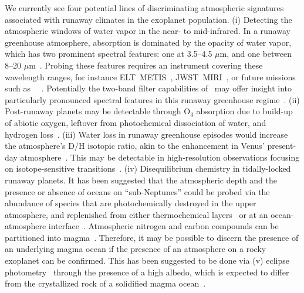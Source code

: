 \documentclass[twocolumn,twocolappendix,linenumbers]{aastex631}
\begin{document}
We currently see four potential lines of discriminating atmospheric signatures associated with runaway climates in the exoplanet population.
(i) Detecting the atmospheric windows of water vapor in the near- to mid-infrared.
In a runaway greenhouse atmosphere, absorption is dominated by the opacity of water vapor, which has two prominent spectral features: one at 3.5--4.5 $\mu$m, and one between 8--20 $\mu$m~\citep[e.g.,][]{Boukrouche2021}.
Probing these features requires an instrument covering these wavelength ranges, for instance ELT~METIS~\citep{Brandl2021}, JWST~MIRI~\citep{Rieke2015}, or future missions such as \life\ ~\citep{2019A&A...621A.125B,Quanz2022,2022A&A...664A..22D}.
Potentially the two-band filter capabilities of \plato\ may offer insight into particularly pronounced spectral features in this runaway greenhouse regime~\citep{2020SSRv..216...98G}.
(ii) Post-runaway planets may be detectable through O$_{3}$ absorption due to build-up of abiotic oxygen, leftover from photochemical dissociation of water, and hydrogen loss~\citep{2014ApJ...785L..20W,Luger2015}.
(iii) Water loss in runaway greenhouse episodes would increase the atmosphere's D/H isotopic ratio, akin to the enhancement in Venus' present-day atmosphere~\citep{2019JGRE..124.2015K,2021JGRE..12606643K}.
This may be detectable in high-resolution observations focusing on isotope-sensitive transitions~\citep{2019AJ....158...26L,2019A&A...622A.139M}.
(iv) Disequilibrium chemistry in tidally-locked runaway planets.
It has been suggested that the atmospheric depth and the presence or absence of oceans on ``sub-Neptunes'' could be probed via the abundance of species that are photochemically destroyed in the upper atmosphere, and replenished from either thermochemical layers~\citep{2021ApJ...914...38Y,2021ApJ...922L..27T} or at an ocean-atmosphere interface~\citep{2019ApJ...887..231L,2021ApJ...921L...8H}.
Atmospheric nitrogen and carbon compounds can be partitioned into magma~\citep{2022E&PSL.59817847G,2022PSJ.....3...93B}.
Therefore, it may be possible to discern the presence of an underlying magma ocean if the presence of an atmosphere on a rocky exoplanet can be confirmed.
This has been suggested to be done via (v) eclipse photometry~\citep{Mansfield2019,2019ApJ...886..140K} through the presence of a high albedo, which is expected to differ from the crystallized rock of a solidified magma ocean~\citep{2020ApJ...898..160E,Fortin2022}.
\end{document}
